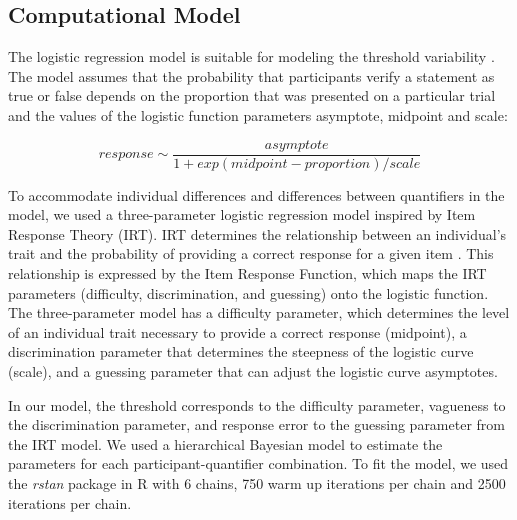 \documentclass{article}
\begin{document}
\subsection{Computational Model}
The logistic regression model is suitable for modeling the threshold variability \cite{Verheyen2018TypicalityDimensionalAdjectives, Ramotowska2020MostDifferences}. The model assumes that the probability that participants verify a statement as true or false depends on the proportion that was presented on a particular trial and the values of the logistic function parameters asymptote, midpoint and scale:

\begin{equation}
   response \sim \frac{asymptote}{1 + exp(midpoint - proportion)/scale}
\end{equation}

To accommodate individual differences and differences between quantifiers in the model, we used a three-parameter logistic regression model inspired by Item Response Theory (IRT). IRT determines the relationship between an individual's trait and the probability of providing a correct response for a given item \cite{Hanlbleton1991FundamentalsData, Ligia2012RelevanceTheory}. This relationship is expressed by the Item Response Function, which maps the IRT parameters (difficulty, discrimination, and guessing) onto the logistic function. The three-parameter model has a difficulty parameter, which determines the level of an individual trait necessary to provide a correct response (midpoint), a discrimination parameter that determines the steepness of the logistic curve (scale), and a guessing parameter that can adjust the logistic curve asymptotes. 

In our model, the threshold corresponds to the difficulty parameter, vagueness to the discrimination parameter, and response error to the guessing parameter from the IRT model. We used a hierarchical Bayesian model to estimate the parameters for each participant-quantifier combination. To fit the model, we used the \textit{rstan} package in R \cite{StanDevelopmentTeam2017Shinystan:Models} %
with 6 chains, 750 warm up iterations per chain and 2500 iterations per chain. 
\end{document}
